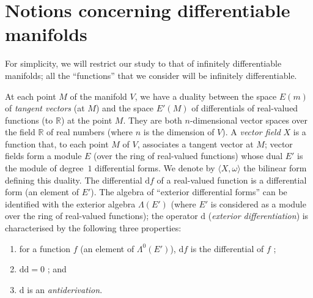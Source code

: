 \documentclass{article}
\newcommand{\dd}{\mathrm{d}}
\newcommand{\RR}{\mathbb{R}}
\newcommand{\oldpage}[1]{\marginpar{\footnotesize$\Big\vert$ \textit{p.~#1}}}
\begin{document}
\section{Notions concerning differentiable manifolds}
\label{I.4}

For simplicity, we will restrict our study to that of infinitely differentiable manifolds;
all the ``functions'' that we consider will be infinitely differentiable.

\oldpage{9}
At each point $M$ of the manifold $V$, we have a duality between the space $E(m)$ of \emph{tangent vectors} (at $M$) and the space $E'(M)$ of differentials of real-valued functions (to $\RR$) at the point $M$.
They are both $n$-dimensional vector spaces over the field $\RR$ of real numbers (where $n$ is the dimension of $V$).
A \emph{vector field} $X$ is a function that, to each point $M$ of $V$, associates a tangent vector at $M$;
vector fields form a module $E$ (over the ring of real-valued functions) whose dual $E'$ is the module of degree~$1$ differential forms.
We denote by $\langle X,\omega\rangle$ the bilinear form defining this duality.
The differential $\dd f$ of a real-valued function is a differential form (an element of $E'$).
The algebra of ``exterior differential forms'' can be identified with the exterior algebra $\Lambda(E')$ (where $E'$ is considered as a module over the ring of real-valued functions);
the operator $\dd$ (\emph{exterior differentiation}) is characterised by the following three properties:
\begin{enumerate}[1)]
  \item for a function $f$ (an element of $\Lambda^0(E')$), $\dd f$ is the differential of $f$ ;
  \item $\dd\dd=0$ ; and
  \item $\dd$ is an \emph{antiderivation}.
\end{enumerate}
\end{document}
